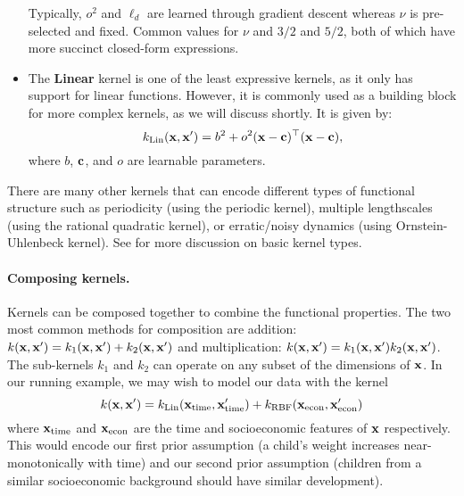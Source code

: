\begin{itemize}
    Typically, $o^2$ and $\ell_d$ are learned through gradient descent whereas $\nu$ is pre-selected and fixed.
    Common values for $\nu$ and $3/2$ and $5/2$, both of which have more succinct closed-form expressions.

  \item The {\bf Linear} kernel is one of the least expressive kernels, as it only has support for linear functions.
    However, it is commonly used as a building block for more complex kernels, as we will discuss shortly.
    It is given by:
    \[ k_\text{Lin} ( \mathbf{x}, \mathbf{x}' ) = b^2 + o^2 (\mathbf{x} - \mathbf{c})^\top (\mathbf{x} - \mathbf{c}), \]
    where $b$, $\mathbf{c}$, and $o$ are learnable parameters.
\end{itemize}

There are many other kernels that can encode different types of functional structure such as periodicity (using the periodic kernel), multiple lengthscales (using the rational quadratic kernel), or erratic/noisy dynamics (using Ornstein-Uhlenbeck kernel).
See \cite{rasmussen2006gaussian} for more discussion on basic kernel types.

\paragraph{Composing kernels.}
Kernels can be composed together to combine the functional properties.
The two most common methods for composition are addition: $k(\mathbf{x}, \mathbf{x}') = k_1(\mathbf{x}, \mathbf{x}') + k_2(\mathbf{x}, \mathbf{x}')$
and multiplication: $k(\mathbf{x}, \mathbf{x}') = k_1(\mathbf{x}, \mathbf{x}') k_2(\mathbf{x}, \mathbf{x}')$.
The sub-kernels $k_1$ and $k_2$ can operate on any subset of the dimensions of $\mathbf{x}$.
In our running example, we may wish to model our data with the kernel
%
\[ k(\mathbf{x}, \mathbf{x}') = k_\text{Lin}( \mathbf{x}_\text{time}, \mathbf{x}_\text{time}' ) + k_\text{RBF}( \mathbf{x}_\text{econ}, \mathbf{x}_\text{econ}' ) \]
%
where $\mathbf{x}_\text{time}$ and $\mathbf{x}_\text{econ}$ are the time and socioeconomic features of $\mathbf{x}$ respectively.
This would encode our first prior assumption (a child's weight increases near-monotonically with time)
and our second prior assumption (children from a similar socioeconomic background should have similar development).


